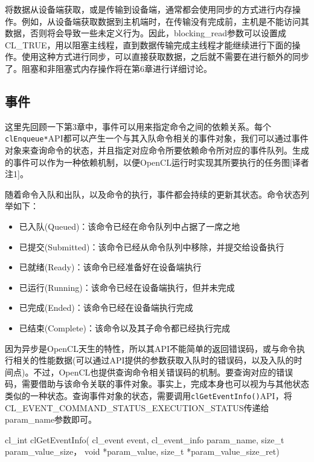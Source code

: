 将数据从设备端获取，或是传输到设备端，通常都会使用同步的方式进行内存操作。例如，从设备端获取数据到主机端时，在传输没有完成前，主机是不能访问其数据，否则将会导致一些未定义行为。因此，blocking\_\allowbreak{}read参数可以设置成CL\_\allowbreak{}TRUE，用以阻塞主线程，直到数据传输完成主线程才能继续进行下面的操作。使用这种方式进行同步，可以直接获取数据，之后就不需要在进行额外的同步了。阻塞和非阻塞式内存操作将在第6章进行详细讨论。

\subsection{事件}

这里先回顾一下第3章中，事件可以用来指定命令之间的依赖关系。每个\texttt{clEnqueue*}API都可以产生一个与其入队命令相关的事件对象，我们可以通过事件对象来查询命令的状态，并且指定对应命令所要依赖命令所对应的事件队列。生成的事件可以作为一种依赖机制，以便OpenCL运行时实现其所要执行的任务图[译者注1]。

随着命令入队和出队，以及命令的执行，事件都会持续的更新其状态。命令状态列举如下：

\begin{itemize}
\item 已入队(Queued)：该命令已经在命令队列中占据了一席之地
\item 已提交(Submitted)：该命令已经从命令队列中移除，并提交给设备执行
\item 已就绪(Ready)：该命令已经准备好在设备端执行
\item 已运行(Running)：该命令已经在设备端执行，但并未完成
\item 已完成(Ended)：该命令已经在设备端执行完成
\item 已结束(Complete)：该命令以及其子命令都已经执行完成
\end{itemize}

因为异步是OpenCL天生的特性，所以其API不能简单的返回错误码，或与命令执行相关的性能数据(可以通过API提供的参数获取入队时的错误码，以及入队的时间点)。不过，OpenCL也提供查询命令相关错误码的机制。要查询对应的错误码，需要借助与该命令关联的事件对象。事实上，完成本身也可以视为与其他状态类似的一种状态。查询事件对象的状态，需要调用\texttt{clGetEventInfo()}API，将CL\_\allowbreak{}EVENT\_\allowbreak{}COMMAND\_\allowbreak{}STATUS\_\allowbreak{}EXECUTION\_\allowbreak{}STATUS传递给param\_\allowbreak{}name参数即可。

\begin{codebox}[cpp]
cl_int
clGetEventInfo(
  cl_event event,
  cl_event_info param_name,
  size_t param_value_size，
  void *param_value,
  size_t *param_value_size_ret)
\end{codebox}

